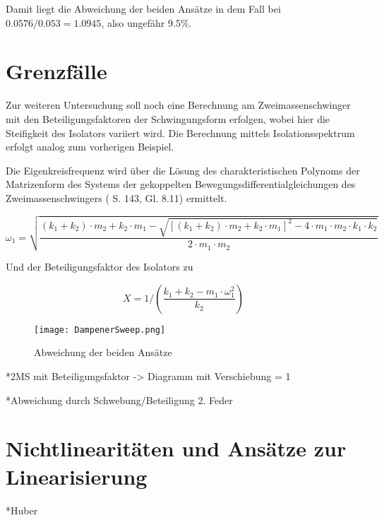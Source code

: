 Damit liegt die Abweichung der beiden Ansätze in dem Fall bei $0.0576/0.053=1.0945$, also ungefähr $9.5\%$.

\pagebreak

\section{Grenzfälle}
\label{sec:grenzfalle}

Zur weiteren Untersuchung soll noch eine Berechnung am Zweimassenschwinger mit den Beteiligungsfaktoren der Schwingungsform erfolgen, wobei hier die Steifigkeit des Isolators variiert wird. Die Berechnung mittels Isolationsspektrum erfolgt analog zum vorherigen Beispiel.

Die Eigenkreisfrequenz wird über die Lösung des charakteristischen Polynoms der Matrizenform des Systems der gekoppelten Bewegungsdifferentialgleichungen des Zweimassenschwingers (\cite{Pocanschi} S. 143, Gl. 8.11) ermittelt.

\begin{equation*}
\omega_1 = \sqrt{\frac{(k_1 + k_2) \cdot m_2 + k_2 \cdot m_1 - \sqrt{[(k_1 + k_2) \cdot m_2 + k_2 \cdot  m_1]^2 - 4 \cdot m_1 \cdot m_2 \cdot k_1 \cdot k_2}}{2 \cdot m_1 \cdot m_2}}
\end{equation*}

Und der Beteiligungsfaktor des Isolators zu

\begin{equation*}
X = 1/\left( \frac{k_1 + k_2 - m_1 \cdot \omega_1^2}{k_2} \right)
\end{equation*}

\begin{figure}[ht] 
    \centering
    \texttt{[image: DampenerSweep.png]}
    \caption{Abweichung der beiden Ansätze}
    \label{fig:Bemessungsspektrum}
\end{figure}

*2MS mit Beteiligungsfaktor  -> Diagramm mit Verschiebung = 1

*Abweichung durch Schwebung/Beteiligung 2. Feder 

\pagebreak

\section{Nichtlinearitäten und Ansätze zur Linearisierung}
\label{sec:nichtlinearitaten}

*Huber

\pagebreak